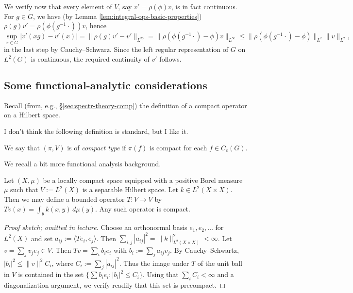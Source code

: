 \documentclass[reqno]{amsart} 
\begin{document}
We verify now that every element of $V$, say $v' = \rho(\phi) v$, is in fact continuous.  For $g \in G$, we have (by Lemma \ref{lem:integral-ops-basic-properties}) $\rho(g) v' = \rho(\phi(g^{-1} \cdot)) v$, hence
\begin{equation*}
  \sup_{x \in G} |v'(x g) - v'(x)| = \|\rho(g) v' - v'\|_{L^\infty} = \|\rho(\phi(g^{-1} \cdot) -\phi ) v\|_{L^\infty} \leq \|\rho(\phi(g^{-1} \cdot) -\phi )\|_{L^2} \| v\|_{L^2},
\end{equation*}
in the last step by Cauchy--Schwarz.  Since the left regular representation of $G$ on $L^2(G)$ is continuous, the required continuity of $v'$ follows.


\subsection{Some functional-analytic considerations}

Recall (from, e.g., \S\ref{sec:spectr-theory-comp}) the definition of a compact operator on a Hilbert space.

I don't think the following definition is standard, but I like it.
\begin{definition}\label{defn:compact-type}
  We say that $(\pi,V)$ is of \emph{compact type} if $\pi(f)$ is compact for each $f \in C_c(G)$.
\end{definition}

We recall a bit more functional analysis background.
\begin{lemma}
  Let $(X,\mu)$ be a locally compact space equipped with a positive Borel measure $\mu$ such that $V := L^2(X)$ is a separable Hilbert space.  Let $k \in L^2(X \times X)$.  Then we may define a bounded operator $T : V \rightarrow V$ by $T v(x) = \int_{y} k(x,y) \, d \mu(y)$.  Any such operator is compact.
\end{lemma}
\begin{proof}
[Proof sketch; omitted in lecture]
  Choose an orthonormal basis $e_1,e_2,\dotsc$ for $L^2(X)$ and set $a_{i j} := \langle T e_i, e_j \rangle$.  Then $\sum_{i,j} |a_{i j}|^2 = \|k\|_{L^2(X \times X)}^2 < \infty$.  Let $v = \sum_j v_j e_j \in V$.  Then $T v = \sum_i b_i e_i$ with $b_i := \sum_j a_{i j} v_j$.  By Cauchy--Schwartz, $|b_i|^2 \leq \|v\|^2 C_i$, where $C_i := \sum_j |a_{i j}|^2$.  Thus the image under $T$ of the unit ball in $V$ is contained in the set $\{\sum b_i e_i : |b_i|^2 \leq C_i \}$.  Using that $\sum_i C_i < \infty$ and a diagonalization argument, we verify readily that this set is precompact.
\end{proof}
\end{document}
